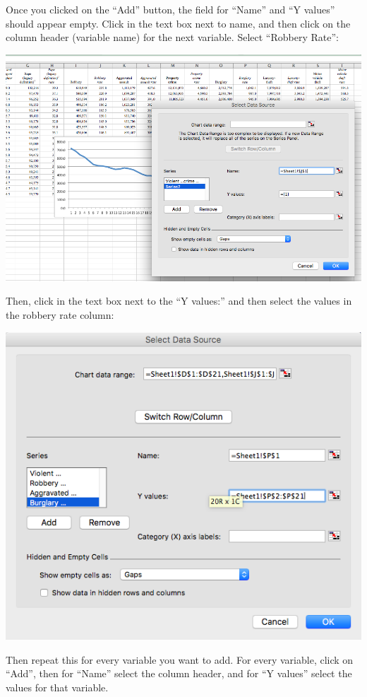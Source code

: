 \documentclass[
]{book}
\begin{document}
Once you clicked on the ``Add'' button, the field for ``Name'' and ``Y values'' should appear empty. Click in the text box next to name, and then click on the column header (variable name) for the next variable. Select ``Robbery Rate'':

\includegraphics{imgs/comp_c_3.png}

Then, click in the text box next to the ``Y values:'' and then select the values in the robbery rate column:

\includegraphics{imgs/comp_c_4.png}

Then repeat this for every variable you want to add. For every variable, click on ``Add'', then for ``Name'' select the column header, and for ``Y values'' select the values for that variable.
\end{document}
